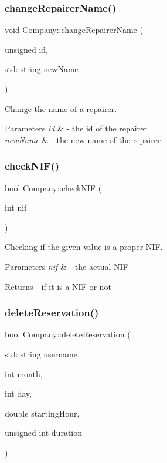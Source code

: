 \subsubsection{\texorpdfstring{change\+Repairer\+Name()}{changeRepairerName()}}
{\footnotesize\ttfamily void Company\+::change\+Repairer\+Name (\begin{DoxyParamCaption}\item[{unsigned}]{id,  }\item[{std\+::string}]{new\+Name }\end{DoxyParamCaption})}



Change the name of a repairer. 


\begin{DoxyParams}{Parameters}
{\em id} & -\/ the id of the repairer \\
\hline
{\em new\+Name} & -\/ the new name of the repairer \\
\hline
\end{DoxyParams}
\mbox{\label{class_company_a53a891acc19de4d24a82fd9f108cfe68}} 
\subsubsection{\texorpdfstring{check\+N\+I\+F()}{checkNIF()}}
{\footnotesize\ttfamily bool Company\+::check\+N\+IF (\begin{DoxyParamCaption}\item[{int}]{nif }\end{DoxyParamCaption})}



Checking if the given value is a proper N\+IF. 


\begin{DoxyParams}{Parameters}
{\em nif} & -\/ the actual N\+IF \\
\hline
\end{DoxyParams}
\begin{DoxyReturn}{Returns}
-\/ if it is a N\+IF or not 
\end{DoxyReturn}
\mbox{\label{class_company_ad6819fd8a928fd10123ad24ca640325c}} 
\subsubsection{\texorpdfstring{delete\+Reservation()}{deleteReservation()}}
{\footnotesize\ttfamily bool Company\+::delete\+Reservation (\begin{DoxyParamCaption}\item[{std\+::string}]{username,  }\item[{int}]{month,  }\item[{int}]{day,  }\item[{double}]{starting\+Hour,  }\item[{unsigned int}]{duration }\end{DoxyParamCaption})}



